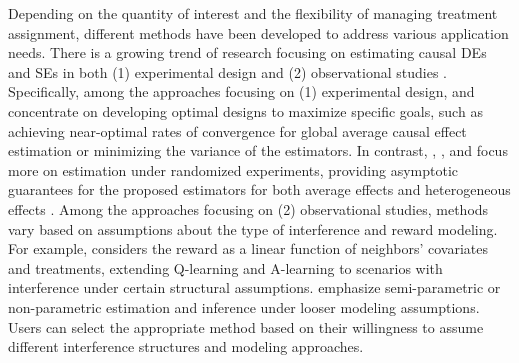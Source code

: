 Depending on the quantity of interest and the flexibility of managing treatment assignment, different methods have been developed to address various application needs. There is a growing trend of research focusing on estimating causal \acrshort{DE}s and \acrshort{SE}s in both (1) experimental design \citep{viviano2020experimental, aronow2017estimating, leung2022rate, viviano2024policy, leung2022causal} and (2) observational studies \citep{forastiere2021identification, qu2021efficient, bargagli2020heterogeneous, su2019modelling}. Specifically, among the approaches focusing on (1) experimental design, \citet{viviano2020experimental} and \citet{leung2022rate} concentrate on developing optimal designs to maximize specific goals, such as achieving near-optimal rates of convergence for global average causal effect estimation \citep{leung2022rate} or minimizing the variance of the estimators. In contrast, \citet{aronow2017estimating}, \citet{leung2022causal}, and \citet{viviano2024policy} focus more on estimation under randomized experiments, providing asymptotic guarantees for the proposed estimators for both average effects \citep{aronow2017estimating, leung2022causal} and heterogeneous effects \citep{viviano2024policy}. Among the approaches focusing on (2) observational studies, methods vary based on assumptions about the type of interference and reward modeling. For example, \citet{su2019modelling} considers the reward as a linear function of neighbors’ covariates and treatments, extending Q-learning and A-learning to scenarios with interference under certain structural assumptions. \citet{forastiere2021identification, qu2021efficient, bargagli2020heterogeneous} emphasize semi-parametric or non-parametric estimation and inference under looser modeling assumptions. Users can select the appropriate method based on their willingness to assume different interference structures and modeling approaches.


